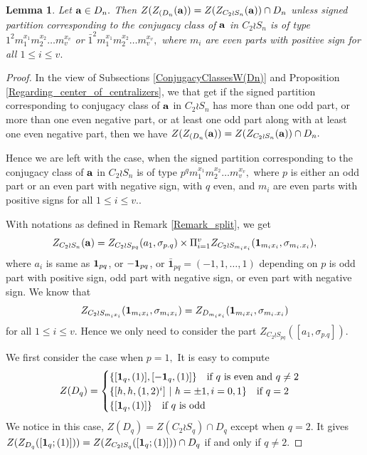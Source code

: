 \documentclass[12pt,twoside,reqno]{amsart}
\newtheorem{lemma}[theorem]{Lemma}
\theoremstyle{definition}
\numberwithin{equation}{section}
\newcommand{\bmf}[1]{\mathbf{#1}}
\begin{document}
\begin{lemma}\label{Center_of_centralizer_in_WDn} Let ${\bf a} \in D_n.$ Then
 $Z(Z_{(D_n}({\bf a}))=Z(Z_{C_2\wr S_n}({\bf a})) \cap D_n$
 unless signed  partition corresponding to the conjugacy class of ${\bf a}$ in $C_2 \wr S_n$ is of type $1^2m_1^{x_1}m_2^{x_2}\dots m_v^{x_v}$ or $\bar{1}^2m_1^{x_1}m_2^{x_2}\dots m_v^{x_v},$ where $m_i$ are even parts with positive sign for all $1\leq i\leq v.$
\end{lemma}
\begin{proof}
 In the view of Subsections \ref{ConjugacyClassesW(Dn)} and Proposition \ref{Regarding_center_of_centralizers}, we that get if the signed partition corresponding to conjugacy class of ${\bf a}$ in $C_2 \wr S_n$ has more than one odd part, or more than one even negative part, or at least one odd part along with at least one even negative part, then we have $Z(Z_{(D_n}({\bf a}))=Z(Z_{C_2\wr S_n}({\bf a})) \cap D_n.$
 
 Hence we are left with the case, when the signed partition corresponding to the conjugacy class of ${\bf a}$ in $C_2 \wr S_n$  is of type $p^qm_1^{x_1}m_2^{x_2}\dots m_v^{x_v},$ where $p$ is either an odd part or an even part with negative sign, with $q$ even, and $m_i$ are even parts with positive signs for all $1\leq i\leq v.$. 
 
 With notations as defined in Remark \ref{Remark_split}, we get
 $$Z_{C_2\wr S_n}({\bf a}) =Z_{C_2\wr S_{pq}}( a_1, \sigma_{p.q}) \times \Pi_{i=1}^v Z_{C_2\wr S_{m_ix_i}}( {\bf 1}_{m_ix_i}, \sigma_{m_i.x_i}),$$
 where $a_i$ is same as ${\bf 1}_{pq}$, or ${\bf -1}_{pq}$, or $\bmf{\bar{1}}_{pq}=(-1,1,\dots,1)$ depending on $p$ is odd part with positive sign, odd part with negative sign, or even part with negative sign. We know that
 $$Z_{C_2\wr S_{m_ix_i}}( {\bf 1}_{m_ix_i}, \sigma_{m_ix_i})= Z_{D_{m_ix_i}}( {\bf 1}_{m_ix_i}, \sigma_{m_i.x_i})$$
 for all $1\leq i\leq v.$ Hence we only need to consider the part $Z_{C_2\wr S_{pq}}( [a_1, \sigma_{p.q}]).$

 We first consider the case when $p=1,$ It is easy to compute
 \[
 Z(D_q)=\begin{cases}
 \{ [{\bf 1}_q, (1)], [{\bf -1}_q, (1)]\} \quad\text{if $q$ is even and $q\neq 2$} \\
 \{[h,h, (1,2)^i]~|~h=\pm1, i=0,1\} \quad\text{if  $q= 2$} \\
 \{ [{\bf 1}_q, (1)] \} \quad\text{if $q$ is odd} \\
 \end{cases}
 \]
 We notice in this case, $Z(D_q)=Z(C_2\wr S_q)\cap D_q$ except when $q=2.$ It gives $Z(Z_{D_q}([{\bf 1}_q;(1)]) )=Z(Z_{C_2\wr S_q}([{\bf 1}_q;(1)])) \cap D_q$ if and only if $q\neq 2.$ 


\end{proof}
\end{document}
